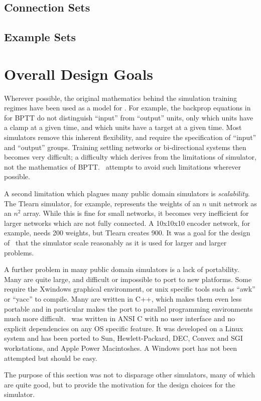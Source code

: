 \documentclass[jou]{apa}
\begin{document}
\subsection{Connection Sets}
\subsection{Example Sets}


\section{Overall Design Goals}

Wherever possible, the original mathematics behind the simulation
training regimes have been used as a model for \mikenet.
For example, the backprop equations in \cite{williams.peng90} for
BPTT do not distinguish ``input'' from ``output'' units, only
which units have a clamp at a given time, and which units
have a target at a given time.  Most simulators remove this inherent
flexibility, and require the specification of ``input'' and 
``output'' groups.  Training settling networks or bi-directional
systems then becomes very difficult; a difficulty which derives
from the limitations of simulator, not the mathematics of BPTT.
\mikenet \, attempts to avoid such limitations wherever possible.

A second limitation which plagues many public domain simulators is
{\em scalability}.  The Tlearn simulator, for example, represents the
weights of an $n$ unit network as an $n^2$ array.  While this is fine
for small networks, it becomes very inefficient for larger networks
which are not fully connected.  A \mbox{10x10x10} encoder network, for
example, needs 200 weights, but Tlearn creates 900.  It was a goal for
the design of \mikenet \, that the simulator scale reasonably as it is
used for larger and larger problems.

A further problem in many public domain simulators is a lack of
portability.  Many are quite large, and difficult or impossible to
port to new platforms.  Some require the Xwindows graphical
environment, or unix specific tools such as ``awk'' or ``yacc'' to
compile.  Many are written in C++, which makes them even less portable
and in particular makes the port to parallel programming environments
much more difficult.  \mikenet \, was written in ANSI C with no
user interface and no explicit dependencies on any OS specific
feature.  It was developed on a Linux system and has been ported
to Sun, Hewlett-Packard, DEC, Convex and SGI workstations, and
Apple Power Macintoshes. A Windows port has not been attempted but
should be easy.

The purpose of this section was not to disparage other simulators,
many of which are quite good, but to provide the motivation for the
design choices for the \mikenet \, simulator.




\end{document}
